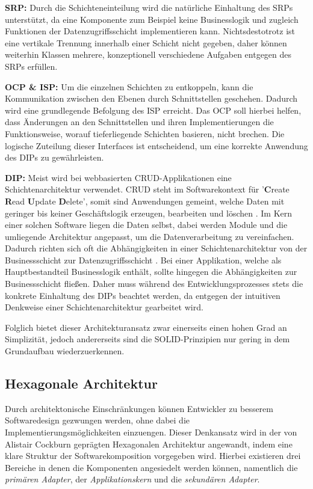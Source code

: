 \textbf{\acrlong{SRP}:} Durch die Schichteneinteilung wird die natürliche Einhaltung des \acrshort{SRP}s unterstützt, da eine Komponente zum Beispiel keine Businesslogik und zugleich Funktionen der Datenzugriffsschicht implementieren kann. Nichtsdestotrotz ist eine vertikale Trennung innerhalb einer Schicht nicht gegeben, daher können weiterhin Klassen mehrere, konzeptionell verschiedene Aufgaben entgegen des SRPs erfüllen. 

\textbf{\acrlong{OCP} \& \acrlong{ISP}:} Um die einzelnen Schichten zu entkoppeln, kann die Kommunikation zwischen den Ebenen durch Schnittstellen geschehen. Dadurch wird eine grundlegende Befolgung des \acrshort{ISP} erreicht. Das \acrlong{OCP} soll hierbei helfen, dass Änderungen an den Schnittstellen und ihren Implementierungen die Funktionsweise, worauf tieferliegende Schichten basieren, nicht brechen. Die logische Zuteilung dieser Interfaces ist entscheidend, um eine korrekte Anwendung des \acrlong{DIP}s zu gewährleisten. 

\textbf{\acrlong{DIP}:} Meist wird bei webbasierten CRUD-Applikationen eine Schichtenarchitektur verwendet. \acrshort{CRUD} steht im Softwarekontext für '\textbf{C}reate \textbf{R}ead \textbf{U}pdate \textbf{D}elete', somit sind Anwendungen gemeint, welche Daten mit geringer bis keiner Geschäftslogik erzeugen, bearbeiten und löschen \cite[S. 381]{Martin.1980}. Im Kern einer solchen Software liegen die Daten selbst, dabei werden Module und die umliegende Architektur angepasst, um die Datenverarbeitung zu vereinfachen. Dadurch richten sich oft die Abhängigkeiten in einer Schichtenarchitektur von der Businessschicht zur Datenzugriffsschicht \cite{Layered.SOLID}. Bei einer Applikation, welche als Hauptbestandteil Businesslogik enthält, sollte hingegen die Abhängigkeiten zur Businessschicht fließen. Daher muss während des Entwicklungsprozesses stets die konkrete Einhaltung des DIPs beachtet werden, da entgegen der intuitiven Denkweise einer Schichtenarchitektur gearbeitet wird. 

Folglich bietet dieser Architekturansatz zwar einerseits einen hohen Grad an Simplizität, jedoch andererseits sind die SOLID-Prinzipien nur gering in dem Grundaufbau wiederzuerkennen.

\subsection{Hexagonale Architektur}

Durch architektonische Einschränkungen können Entwickler zu besserem Softwaredesign gezwungen werden, ohne dabei die Implementierungsmöglichkeiten einzuengen. Dieser Denkansatz wird in der von Alistair Cockburn geprägten Hexagonalen Architektur angewandt, indem eine klare Struktur der Softwarekomposition vorgegeben wird. Hierbei existieren drei Bereiche in denen die Komponenten angesiedelt werden können, namentlich die \emph{primären Adapter}, der \emph{Applikationskern} und die \emph{sekundären Adapter}. \cite{Cockburn.Hexagonal, Griffin.2021b}  

